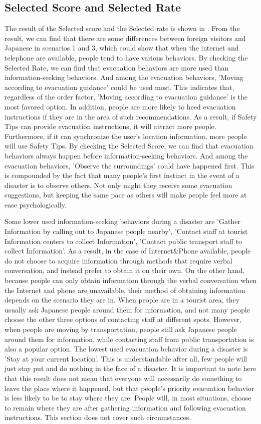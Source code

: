 \subsection{Selected Score and Selected Rate}
The result of the Selected score and the Selected rate is shown in . From the result, we can find that there are some differences between foreign visitors and Japanese in scenarios 1 and 3, which could show that when the internet and telephone are available, people tend to have various behaviors. By checking the Selected Rate, we can find that evacuation behaviors are more used than information-seeking behaviors. And among the evacuation behaviors, 'Moving according to evacuation guidance' could be used most. This indicates that, regardless of the order factor, 'Moving according to evacuation guidance' is the most favored option. In addition, people are more likely to heed evacuation instructions if they are in the area of such recommendations. As a result, if Safety Tips can provide evacuation instructions, it will attract more people. Furthermore, if it can synchronize the user's location information, more people will use Safety Tips. By checking the Selected Score, we can find that evacuation behaviors always happen before information-seeking behaviors. And among the evacuation behaviors, 'Observe the surroundings' could have happened first. This is compounded by the fact that many people's first instinct in the event of a disaster is to observe others. Not only might they receive some evacuation suggestions, but keeping the same pace as others will make people feel more at ease psychologically.

Some lower used information-seeking behaviors during a disaster are 'Gather Information by calling out to Japanese people nearby', 'Contact staff at tourist Information centers to collect Information', 'Contact public transport staff to collect Information'. As a result, in the case of Internet\&Phone available, people do not choose to acquire information through methods that require verbal conversation, and instead prefer to obtain it on their own. On the other hand, because people can only obtain information through the verbal conversation when the Internet and phone are unavailable, their method of obtaining information depends on the scenario they are in. When people are in a tourist area, they usually ask Japanese people around them for information, and not many people choose the other three options of contacting staff at different spots. However, when people are moving by transportation, people still ask Japanese people around them for information, while contacting staff from public transportation is also a popular option. The lowest used evacuation behavior during a disaster is 'Stay at your current location'. This is understandable after all, few people will just stay put and do nothing in the face of a disaster. It is important to note here that this result does not mean that everyone will necessarily do something to leave the place where it happened, but that people's priority evacuation behavior is less likely to be to stay where they are. People will, in most situations, choose to remain where they are after gathering information and following evacuation instructions. This section does not cover such circumstances.

